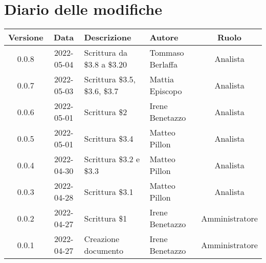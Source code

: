 \section*{Diario delle modifiche}
	\begin{center}
	\renewcommand{\arraystretch}{1.8} %
	\begin{tabular}{ |c|c|m{12em}|m{7em}|c| }
	\hline
	
	\textbf{Versione} & \textbf{Data} & \textbf{Descrizione} &  \textbf{Autore} &  \textbf{Ruolo} \\ %
	\hline
    0.0.8 & 2022-05-04 & Scrittura da \$3.8 a \$3.20 & Tommaso \newline Berlaffa & Analista\\
    \hline
    0.0.7 & 2022-05-03 & Scrittura \$3.5, \$3.6, \$3.7 & Mattia \newline Episcopo & Analista\\
	\hline
    0.0.6 & 2022-05-01 & Scrittura \$2 & Irene Benetazzo & Analista\\
	\hline
    0.0.5 & 2022-05-01 & Scrittura \$3.4 & Matteo Pillon & Analista \\ %
	\hline
    0.0.4 & 2022-04-30 & Scrittura \$3.2 e \$3.3 & Matteo Pillon & Analista \\ %
	\hline
    0.0.3 & 2022-04-28 & Scrittura \$3.1 & Matteo Pillon & Analista \\ %
	\hline
    0.0.2 & 2022-04-27 & Scrittura \$1 & Irene Benetazzo & Amministratore\\ %
	\hline
    0.0.1 & 2022-04-27 & Creazione documento & Irene Benetazzo & Amministratore\\
	\hline
	\end{tabular}
	\end{center}
	\newpage